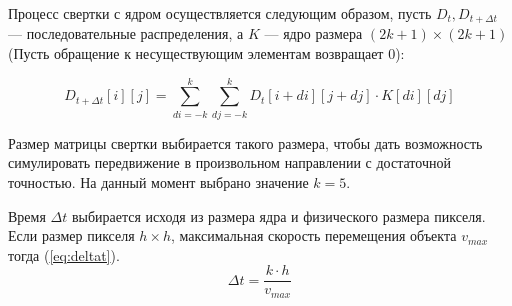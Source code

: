 Процесс свертки с ядром осуществляется следующим образом, пусть $D_t, D_{t+\Delta t}$ ---
последовательные распределения, а $K$ --- ядро размера $(2k+1) \times (2k+1)$
(Пусть обращение к несуществующим элементам возвращает 0):

\begin{equation}
  D_{t+\Delta t}[i][j] = \sum\limits_{di=-k}^k \sum\limits_{dj=-k}^k D_t[i+di][j+dj] \cdot K[di][dj]
\end{equation}

Размер матрицы свертки выбирается такого размера, чтобы дать возможность симулировать
передвижение в произвольном направлении с достаточной точностью. На данный момент выбрано
значение $k = 5$.

Время $\Delta t$ выбирается исходя из размера ядра и физического размера пикселя.
Если размер пикселя $h \times h$, максимальная скорость перемещения объекта $v_{max}$
тогда (\ref{eq:deltat}). 
\begin{equation}\label{eq:deltat}
  \Delta t = \frac {k \cdot h} {v_{max}}
\end{equation}

